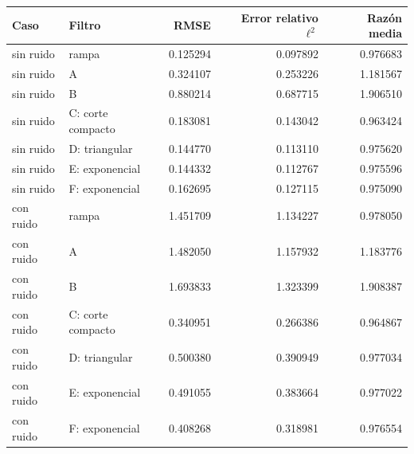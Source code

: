 \begin{tabular}{llrrr}
\toprule
Caso & Filtro & RMSE & Error relativo $\ell^2$ & Razón media \\
\midrule
sin ruido & rampa & 0.125294 & 0.097892 & 0.976683 \\
sin ruido & A & 0.324107 & 0.253226 & 1.181567 \\
sin ruido & B & 0.880214 & 0.687715 & 1.906510 \\
sin ruido & C: corte compacto & 0.183081 & 0.143042 & 0.963424 \\
sin ruido & D: triangular & 0.144770 & 0.113110 & 0.975620 \\
sin ruido & E: exponencial & 0.144332 & 0.112767 & 0.975596 \\
sin ruido & F: exponencial & 0.162695 & 0.127115 & 0.975090 \\
con ruido & rampa & 1.451709 & 1.134227 & 0.978050 \\
con ruido & A & 1.482050 & 1.157932 & 1.183776 \\
con ruido & B & 1.693833 & 1.323399 & 1.908387 \\
con ruido & C: corte compacto & 0.340951 & 0.266386 & 0.964867 \\
con ruido & D: triangular & 0.500380 & 0.390949 & 0.977034 \\
con ruido & E: exponencial & 0.491055 & 0.383664 & 0.977022 \\
con ruido & F: exponencial & 0.408268 & 0.318981 & 0.976554 \\
\bottomrule
\end{tabular}
